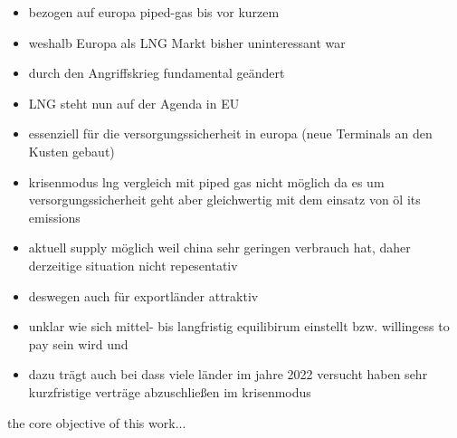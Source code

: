 \begin{itemize}
	\item bezogen auf europa piped-gas bis vor kurzem
	\item weshalb Europa als LNG Markt bisher uninteressant war 
	\item durch den Angriffskrieg fundamental geändert 
	\item LNG steht nun auf der Agenda in EU
	\item essenziell für die versorgungssicherheit in europa (neue Terminals an den Kusten gebaut)
	\item krisenmodus lng vergleich mit piped gas nicht möglich da es um versorgungssicherheit geht aber gleichwertig mit dem einsatz von öl its emissions
	\item aktuell supply möglich weil china sehr geringen verbrauch hat, daher derzeitige situation nicht repesentativ 
	\item deswegen auch für exportländer attraktiv 
	\item unklar wie sich mittel- bis langfristig equilibirum einstellt bzw. willingess to pay sein wird und 
	\item dazu trägt auch bei dass viele länder im jahre 2022 versucht haben sehr kurzfristige verträge abzuschließen im krisenmodus 
\end{itemize}

the core objective of this work...